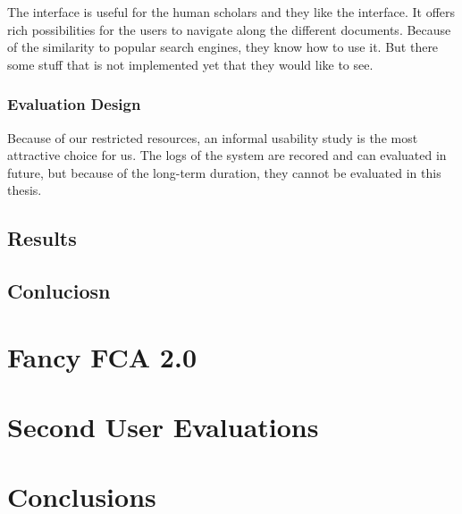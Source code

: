 \documentclass[11pt]{report}
\begin{document}
The interface is useful for the human scholars and they like the interface. It offers rich possibilities for the users to navigate along the different documents. Because of the similarity to popular search engines, they know how to use it. But there some stuff that is not implemented yet that they would like to see.

\subsection{Evaluation Design}

Because of our restricted resources, an informal usability study is the most attractive choice for us. The logs of the system are recored and can evaluated in future, but because of the long-term duration, they cannot be evaluated in this thesis.
\section{Results}

\section{Conluciosn}

\chapter{Fancy FCA 2.0}

\chapter{Second User Evaluations}

\blindtext

\chapter{Conclusions}

\blindtext

\newpage



\end{document}
